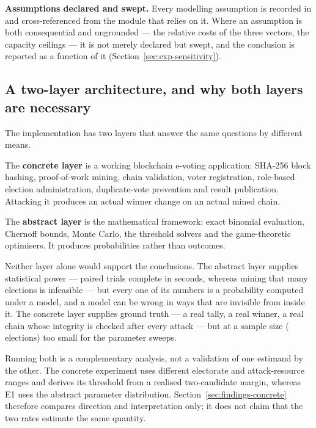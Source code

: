 \textbf{Assumptions declared and swept.} Every modelling assumption is
recorded in  and cross-referenced from the module
that relies on it. Where an assumption is both consequential and
ungrounded --- the relative costs of the three vectors, the capacity
ceilings --- it is not merely declared but swept, and the conclusion is
reported as a function of it (Section~\ref{sec:exp-sensitivity}).

\subsection{A two-layer architecture, and why both layers are necessary}
\label{sec:method-twolayer}

The implementation has two layers that answer the same questions by
different means.

The \textbf{concrete layer} is a working blockchain e-voting
application: SHA-256 block hashing, proof-of-work mining, chain
validation, voter registration, role-based election administration,
duplicate-vote prevention and result publication. Attacking it produces
an actual winner change on an actual mined chain.

The \textbf{abstract layer} is the mathematical framework: exact
binomial evaluation, Chernoff bounds, Monte Carlo, the threshold
solvers and the game-theoretic optimisers. It produces probabilities
rather than outcomes.

Neither layer alone would support the conclusions. The abstract layer
supplies statistical power --- \TotalTrials{} paired trials complete in
\RuntimeSeconds{} seconds, whereas mining that many elections is
infeasible --- but every one of its numbers is a probability computed
under a model, and a model can be wrong in ways that are invisible from
inside it. The concrete layer supplies ground truth --- a real tally, a
real winner, a real chain whose integrity is checked after every attack
--- but at a sample size (\ElectionTrials{} elections) too small for
the parameter sweeps.

Running both is a complementary analysis, not a validation of one
estimand by the other. The concrete experiment uses different electorate
and attack-resource ranges and derives its threshold from a realised
two-candidate margin, whereas E1 uses the abstract parameter distribution.
Section~\ref{sec:findings-concrete} therefore compares direction and
interpretation only; it does not claim that the two rates estimate the same
quantity.

